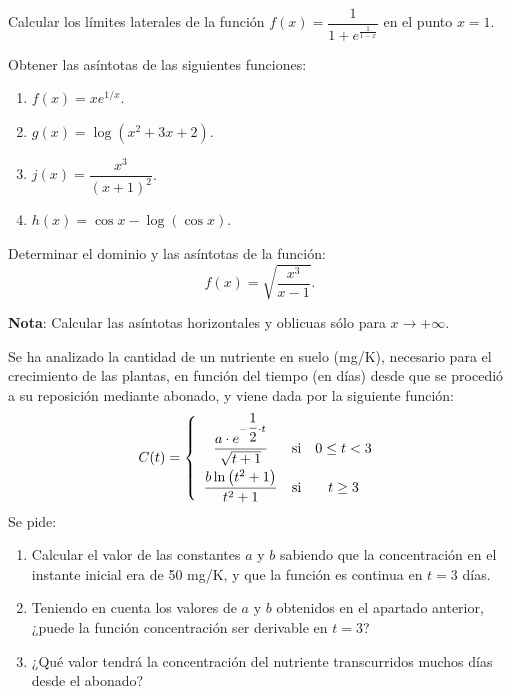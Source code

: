 {Calcular los límites laterales de la función
$f(x)=\dfrac{1}{1+e^{\frac{1}{1-x}}}$ en el punto $x=1$.
}


{Obtener las asíntotas de las siguientes funciones:
\begin{multicols}{2}
\begin{enumerate}
    \item  $f(x)=xe^{1/x}$.

    \item  $g(x)=\log(x^2+3x+2)$.

    \item  $j(x)=\dfrac{x^3}{(x+1)^2}$.
    
    \item  $h(x)=\cos x-\log(\cos x)$.
\end{enumerate}
\end{multicols}
}


{Determinar el dominio y las asíntotas de la función:
\[f(x)=\sqrt{\frac{x^3}{x-1}}.\]

\noindent\textbf{Nota}: Calcular las asíntotas horizontales y oblicuas sólo para $x\rightarrow +\infty$.
}


{Se ha analizado la cantidad de un nutriente en suelo (mg/K), necesario para el crecimiento de las plantas, en función del tiempo (en días) desde que se procedió a su reposición mediante abonado, y viene dada por la siguiente función:
\[
\renewcommand{\arraystretch}{2.2}
C(t) = \left\{ {\begin{array}{*{20}c}
   {\dfrac{{a \cdot e^{ - \dfrac{1}{2}\cdot t} }}{{\sqrt {t + 1} }}} & {{\rm si}} & {0 \le t < 3}  \\
   {\dfrac{{b\ln \left( {t^2  + 1} \right)}}{{t^2  + 1}}} & {{\rm si}} & {t \ge 3}  \\
\end{array}} \right.
\]
Se pide:
\begin{enumerate}
\item Calcular el valor de las constantes $a$ y $b$ sabiendo que la concentración en el instante inicial era de 50 mg/K, y que la función es continua en $t=3$ días.
\item Teniendo en cuenta los valores de $a$ y $b$ obtenidos en el apartado anterior, ¿puede la función concentración ser derivable en $t=3$?
\item ¿Qué valor tendrá la concentración del nutriente transcurridos muchos días desde el abonado?
\end{enumerate}
}


